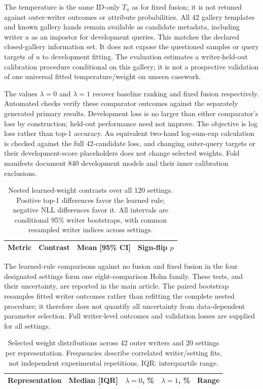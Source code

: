 \documentclass[10pt,a4paper]{article}
\begin{document}
The temperature is the same ID-only $T_u$ as for fixed fusion; it is not retuned against outer-writer outcomes or attribute probabilities. All 42 gallery templates and known gallery hands remain available as candidate metadata, including writer $u$ as an impostor for development queries. This matches the declared closed-gallery information set. It does not expose the questioned samples or query targets of $u$ to development fitting. The evaluation estimates a writer-held-out calibration procedure conditional on this gallery; it is not a prospective validation of one universal fitted temperature/weight on unseen casework.

The values $\lambda=0$ and $\lambda=1$ recover baseline ranking and fixed fusion respectively. Automated checks verify these comparator outcomes against the separately generated primary results. Development loss is no larger than either comparator's loss by construction; held-out performance need not improve. The objective is log loss rather than top-1 accuracy. An equivalent two-hand log-sum-exp calculation is checked against the full 42-candidate loss, and changing outer-query targets or their development-score placeholders does not change selected weights. Fold manifests document 840 development models and their inner calibration exclusions.

\begin{table}[ht]
\centering\small
\caption{Nested learned-weight contrasts over all 120 settings. Positive top-1 differences favor the learned rule; negative NLL differences favor it. All intervals are conditional 95\% writer bootstraps, with common resampled writer indices across settings.}
\begin{tabular}{llrr}\toprule
Metric & Contrast & Mean [95\% CI] & Sign-flip $p$\\\midrule

\end{tabular}
\end{table}

The learned-rule comparisons against no fusion and fixed fusion in the four designated settings form one eight-comparison Holm family. These tests, and their uncertainty, are reported in the main article. The paired bootstrap resamples fitted writer outcomes rather than refitting the complete nested procedure; it therefore does not quantify all uncertainty from data-dependent parameter selection. Full writer-level outcomes and validation losses are supplied for all settings.

\begin{table}[ht]
\centering\small
\caption{Selected weight distributions across 42 outer writers and 20 settings per representation. Frequencies describe correlated writer/setting fits, not independent experimental repetitions. IQR: interquartile range.}
\begin{tabular}{lrrrr}\toprule
Representation & Median [IQR] & $\lambda=0$, \% & $\lambda=1$, \% & Range\\\midrule

\end{tabular}
\end{table}
\end{document}
